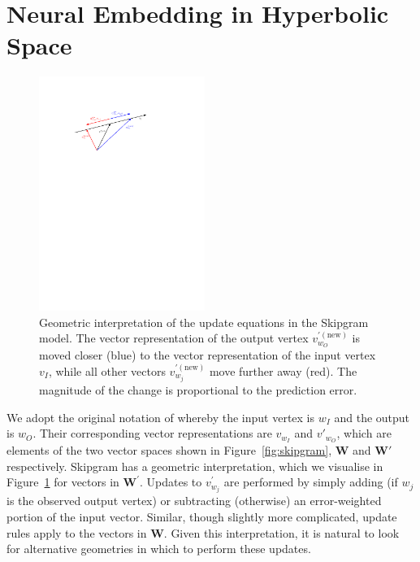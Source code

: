 \documentclass[sigconf, review]{acmart}
\begin{document}
\section{Neural Embedding in Hyperbolic Space}

\begin{figure}[tb]
\centering
\includegraphics[width=0.48\textwidth]{stretch}
\caption{Geometric interpretation of the update equations in the Skipgram model. The vector representation of the output vertex $v_{w_O}^{\prime(\mathrm{new})}$ is moved closer (blue) to the vector representation of the input vertex $v_I$, while all other vectors $v_{w_j}^{\prime(\mathrm{new})}$ move further away (red). The magnitude of the change is proportional to the prediction error.}
\label{fig:skipgram_updates}
\end{figure}

We adopt the original notation of \cite{Mikolov2013} whereby the input vertex is  $w_I$ and the output is $w_O$. Their corresponding vector representations are $v_{w_I}$ and $v'_{w_O}$, which are elements of the two vector spaces shown in Figure~\ref{fig:skipgram}, $\mathbf{W}$ and $\mathbf{W'}$ respectively.
Skipgram has a geometric interpretation, which we visualise in Figure~\ref{fig:skipgram_updates} for vectors in $\mathbf{W}^\prime$. Updates to $v^\prime_{w_j}$ are performed by simply adding (if $w_j$ is the observed output vertex) or subtracting (otherwise) an error-weighted portion of the input vector. Similar, though slightly more complicated, update rules apply to the vectors in $\mathbf{W}$. Given this interpretation, it is natural to look for alternative geometries in which to perform these updates.
\end{document}

